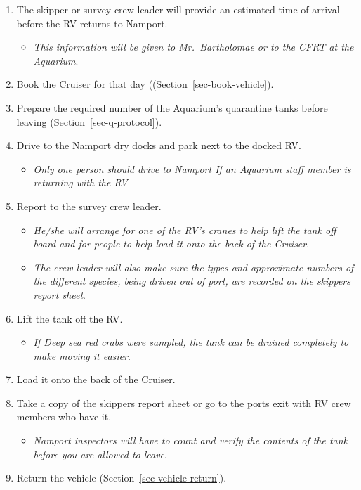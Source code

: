 \documentclass[
  12pt,
]{report}
\providecommand{\tightlist}{%
  \setlength{\itemsep}{0pt}\setlength{\parskip}{0pt}}\usepackage{longtable,booktabs,array}
\begin{document}
\begin{enumerate}
\def\labelenumi{\arabic{enumi}.}
\setcounter{enumi}{19}
\tightlist
\item
  The skipper or survey crew leader will provide an estimated time of
  arrival before the RV returns to Namport.

  \begin{itemize}
  \tightlist
  \item
    \emph{This information will be given to Mr.~Bartholomae or to the
    CFRT at the Aquarium}.
  \end{itemize}
\item
  Book the Cruiser for that day ((Section~\ref{sec-book-vehicle}).
\item
  Prepare the required number of the Aquarium's quarantine tanks before
  leaving (Section~\ref{sec-q-protocol}).
\item
  Drive to the Namport dry docks and park next to the docked RV.

  \begin{itemize}
  \tightlist
  \item
    \emph{Only one person should drive to Namport If an Aquarium staff
    member is returning with the RV}
  \end{itemize}
\item
  Report to the survey crew leader.

  \begin{itemize}
  \tightlist
  \item
    \emph{He/she will arrange for one of the RV's cranes to help lift
    the tank off board and for people to help load it onto the back of
    the Cruiser}.
  \item
    \emph{The crew leader will also make sure the types and approximate
    numbers of the different species, being driven out of port, are
    recorded on the skippers report sheet}.
  \end{itemize}
\item
  Lift the tank off the RV.

  \begin{itemize}
  \tightlist
  \item
    \emph{If Deep sea red crabs were sampled, the tank can be drained
    completely to make moving it easier}.
  \end{itemize}
\item
  Load it onto the back of the Cruiser.
\item
  Take a copy of the skippers report sheet or go to the ports exit with
  RV crew members who have it.

  \begin{itemize}
  \tightlist
  \item
    \emph{Namport inspectors will have to count and verify the contents
    of the tank before you are allowed to leave}.
  \end{itemize}
\item
  Return the vehicle (Section~\ref{sec-vehicle-return}).
\end{enumerate}
\end{document}
